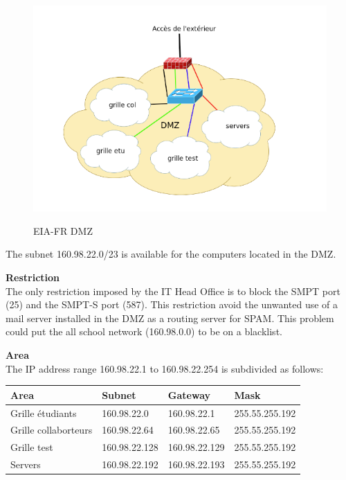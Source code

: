 \begin{figure}[ht]
	\caption{EIA-FR DMZ}
  	\centering
	\includegraphics[scale=0.6]{./pic/dmz1.png}
	\label{fig:eia_dmz}
\end{figure}

The subnet 160.98.22.0/23 is available for the computers located in the DMZ. \s

\textbf{Restriction}\\
The only restriction imposed by the IT Head Office is to block the SMPT port (25) and the SMPT-S port (587). This restriction avoid the unwanted use of a mail server installed in the DMZ as a routing server for SPAM. This problem could put the all school network (160.98.0.0) to be on a blacklist. \s

\textbf{Area}\\
The IP address range 160.98.22.1 to 160.98.22.254 is subdivided as follows:

\begin{center}
\begin{tabular}{|p{2.5cm}|p{2.5cm}|p{2.5cm}|p{2.5cm}|}
\hline
\textbf{Area} & \textbf{Subnet}	& \textbf{Gateway} & \textbf{Mask}\\ \hline
Grille étudiants & 160.98.22.0 & 160.98.22.1 & 255.55.255.192 \\ \hline
Grille collaborteurs & 160.98.22.64 & 160.98.22.65 & 255.55.255.192 \\ \hline
Grille test & 160.98.22.128 & 160.98.22.129 & 255.55.255.192 \\ \hline
Servers & 160.98.22.192 & 160.98.22.193 & 255.55.255.192 \\ \hline
\end{tabular}
\end{center}\s

